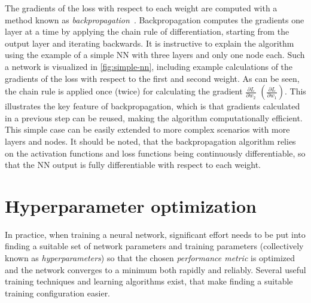The gradients of the loss with respect to each weight are computed with a method known as \emph{backpropagation}~\cite{Rumelhart_1986}. Backpropagation computes the gradients one layer at a time by applying the chain rule of differentiation, starting from the output layer and iterating backwards.
It is instructive to explain the algorithm using the example of a simple NN with three layers and only one node each. Such a network is visualized in \cref{fig:simple-nn}, including example calculations of the gradients of the loss with respect to the first and second weight.
As can be seen, the chain rule is applied once (twice) for calculating the gradient $\frac{\partial L}{\partial w_2}$ $\left( \frac{\partial L}{\partial w_1}\right)$. 
This illustrates the key feature of backpropagation, which is that gradients calculated in a previous step can be reused, making the algorithm computationally efficient.
This simple case can be easily extended to more complex scenarios with more layers and nodes.
It should be noted, that the backpropagation algorithm relies on the activation functions and loss functions being continuously differentiable, so that the NN output is fully differentiable with respect to each weight.



\section{Hyperparameter optimization} 
\label{sec:hyperpar-opt}
In practice, when training a neural network, significant effort needs to be put into finding a suitable set of network parameters and training parameters (collectively known as \emph{hyperparameters}) so that the chosen \emph{performance metric} is optimized and the network converges to a minimum both rapidly and reliably. 
Several useful training techniques and learning algorithms exist, that make finding a suitable training configuration easier.

